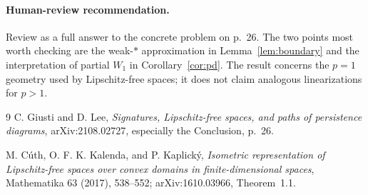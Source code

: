 \documentclass[11pt]{article}
\begin{document}
\paragraph{Human-review recommendation.}
Review as a full answer to the concrete problem on p.~26.  The two points
most worth checking are the weak-$*$ approximation in
Lemma~\ref{lem:boundary} and the interpretation of partial $W_1$ in
Corollary~\ref{cor:pd}.  The result concerns the $p=1$ geometry used by
Lipschitz-free spaces; it does not claim analogous linearizations for
$p>1$.

\begin{thebibliography}{9}
C. Giusti and D. Lee,
\emph{Signatures, Lipschitz-free spaces, and paths of persistence diagrams},
arXiv:2108.02727, especially the Conclusion, p.~26.

M. C\'uth, O. F. K. Kalenda, and P. Kaplick\'y,
\emph{Isometric representation of Lipschitz-free spaces over convex domains
in finite-dimensional spaces},
Mathematika 63 (2017), 538--552; arXiv:1610.03966,
Theorem~1.1.
\end{thebibliography}
\end{document}
